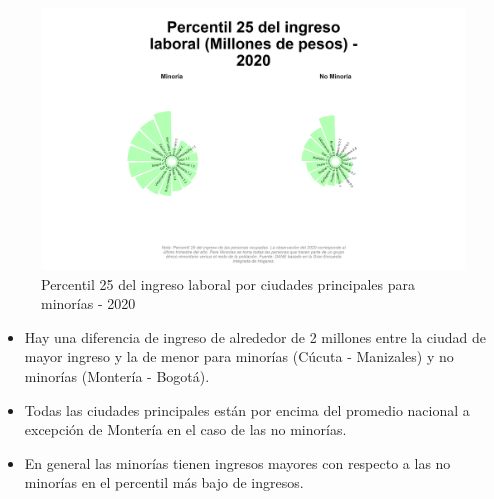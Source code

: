     \begin{figure}[H]
        \caption{Percentil 25 del ingreso laboral por ciudades principales para minorías - 2020 \label{map_result_2} }
        \begin{center}
        \includegraphics[width=\textwidth,keepaspectratio]{img/var_1_static.png}
        \end{center}
    \end{figure}
            \begin{itemize}
                    \item Hay una diferencia de ingreso de alrededor de 2 millones entre la ciudad de mayor ingreso y la de menor para minorías (Cúcuta -  Manizales) y no minorías (Montería - Bogotá).
                    \item Todas las ciudades principales están por encima del promedio nacional a excepción de Montería en el caso de las no minorías.
                    \item En general las minorías tienen ingresos mayores con respecto a las no minorías en el percentil más bajo de ingresos.
                \end{itemize}

